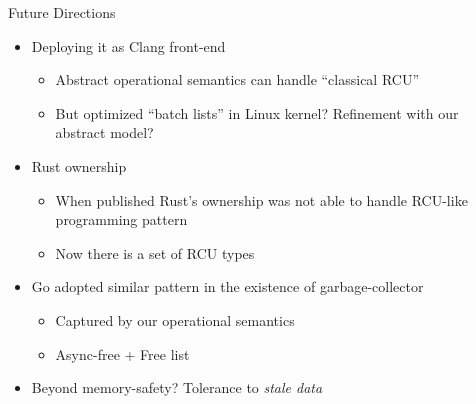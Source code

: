 \documentclass[aspectratio=169,xcolor=dvipsnames]{beamer}
\begin{document}
\begin{frame}{Future Directions}
    \begin{itemize}
        \item Deploying it as Clang front-end
        \begin{itemize}
            \item Abstract operational semantics can handle “classical RCU”
            \item But optimized “batch lists” in Linux kernel? Refinement with our abstract model?
        \end{itemize}
        \item Rust ownership
        \begin{itemize}
            \item When published Rust's ownership was not able to handle RCU-like programming pattern
            \item Now there is a set of RCU types
        \end{itemize}  
        \item Go adopted similar pattern in the existence of garbage-collector
        \begin{itemize}
            \item Captured by our operational semantics 
            \item Async-free + Free list
        \end{itemize}
        \item Beyond memory-safety? Tolerance to \emph{stale data}
    \end{itemize}
\end{frame}
    \scriptsize
    
    

\end{document}

